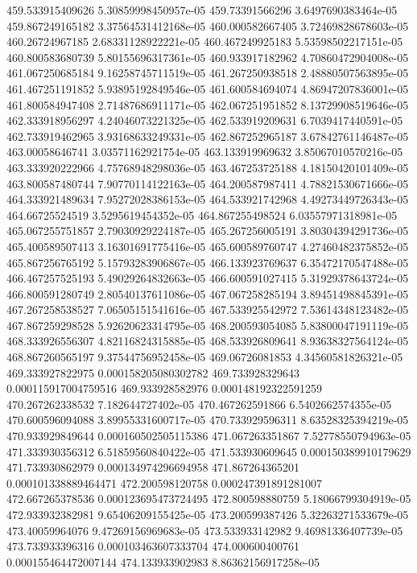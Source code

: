 {459.533915409626 5.30859998450957e-05
459.73391566296 3.6497690383464e-05
459.867249165182 3.37564531412168e-05
460.000582667405 3.72469828678603e-05
460.26724967185 2.68331128922221e-05
460.467249925183 5.53598502217151e-05
460.800583680739 5.80155696317361e-05
460.933917182962 4.70860472904008e-05
461.067250685184 9.16258745711519e-05
461.267250938518 2.48880507563895e-05
461.467251191852 5.93895192849546e-05
461.600584694074 4.86947207836001e-05
461.800584947408 2.71487686911171e-05
462.067251951852 8.13729908519646e-05
462.333918956297 4.24046073221325e-05
462.533919209631 6.7039417440591e-05
462.733919462965 3.93168633249331e-05
462.867252965187 3.67842761146487e-05
463.00058646741 3.03571162921754e-05
463.133919969632 3.85067010570216e-05
463.333920222966 4.75768948298036e-05
463.467253725188 4.18150420101409e-05
463.800587480744 7.90770114122163e-05
464.200587987411 4.78821530671666e-05
464.333921489634 7.95272028386153e-05
464.533921742968 4.49273449726343e-05
464.66725524519 3.5295619454352e-05
464.867255498524 6.03557971318981e-05
465.067255751857 2.79030929224187e-05
465.267256005191 3.80304394291736e-05
465.400589507413 3.16301691775416e-05
465.600589760747 4.27460482375852e-05
465.867256765192 5.15793283906867e-05
466.133923769637 6.35472170547488e-05
466.467257525193 5.49029264832663e-05
466.600591027415 5.31929378643724e-05
466.800591280749 2.80540137611086e-05
467.067258285194 3.89451498845391e-05
467.267258538527 7.06505151541616e-05
467.533925542972 7.53614348123482e-05
467.867259298528 5.92620623314795e-05
468.200593054085 5.83800047191119e-05
468.333926556307 4.82116824315885e-05
468.533926809641 8.93638327564124e-05
468.867260565197 9.37544756952458e-05
469.06726081853 4.34560581826321e-05
469.333927822975 0.000158205080302782
469.733928329643 0.000115917004759516
469.933928582976 0.000148192322591259
470.267262338532 7.182644727402e-05
470.467262591866 6.5402662574355e-05
470.600596094088 3.89955331600717e-05
470.733929596311 8.63528325394219e-05
470.933929849644 0.000160502505115386
471.067263351867 7.52778550794963e-05
471.333930356312 6.51859560840422e-05
471.533930609645 0.000150389910179629
471.733930862979 0.000134974296694958
471.867264365201 0.000101338889464471
472.200598120758 0.000247391891281007
472.667265378536 0.000123695473724495
472.800598880759 5.18066799304919e-05
472.933932382981 9.65406209155425e-05
473.200599387426 5.32263271533679e-05
473.40059964076 9.47269156969683e-05
473.533933142982 9.46981336407739e-05
473.733933396316 0.000103463607333704
474.000600400761 0.000155464472007144
474.133933902983 8.86362156917258e-05
}
